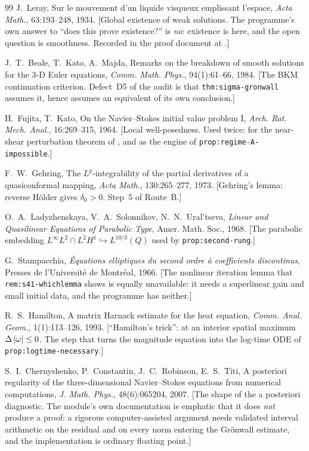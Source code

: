 \begin{thebibliography}{99}
  J.~Leray,
  Sur le mouvement d'un liquide visqueux emplissant l'espace,
  \emph{Acta Math.}, 63:193--248, 1934.
  \textsf{[Global existence of weak solutions. The programme's own answer to
  ``does this prove existence?'' is \emph{no}: existence is here, and the open
  question is smoothness. Recorded in the proof document at .]}

  J.~T.~Beale, T.~Kato, A.~Majda,
  Remarks on the breakdown of smooth solutions for the 3-D Euler equations,
  \emph{Comm. Math. Phys.}, 94(1):61--66, 1984.
  \textsf{[The BKM continuation criterion. Defect~D5 of the  audit is
  that \texttt{thm:sigma-gronwall} assumes it, hence assumes an equivalent of
  its own conclusion.]}

  H.~Fujita, T.~Kato,
  On the Navier--Stokes initial value problem I,
  \emph{Arch. Rat. Mech. Anal.}, 16:269--315, 1964.
  \textsf{[Local well-posedness. Used twice: for the near-shear perturbation
  theorem of , and as the engine of
  \texttt{prop:regime-A-impossible}.]}

  F.~W.~Gehring,
  The \(L^p\)-integrability of the partial derivatives of a quasiconformal
  mapping,
  \emph{Acta Math.}, 130:265--277, 1973.
  \textsf{[Gehring's lemma: reverse H\"older gives \(\delta_0>0\). Step~5 of
  Route~B.]}

  O.~A.~Ladyzhenskaya, V.~A.~Solonnikov, N.~N.~Ural'tseva,
  \emph{Linear and Quasilinear Equations of Parabolic Type},
  Amer. Math. Soc., 1968.
  \textsf{[The parabolic embedding \(L^\infty L^2\cap L^2H^1\hookrightarrow
  L^{10/3}(Q)\) used by \texttt{prop:second-rung}.]}

  G.~Stampacchia,
  \emph{\'Equations elliptiques du second ordre \`a coefficients
  discontinus},
  Presses de l'Universit\'e de Montr\'eal, 1966.
  \textsf{[The nonlinear iteration lemma that
  \texttt{rem:s41-whichlemma} shows is equally unavailable: it needs a
  superlinear gain and small initial data, and the programme has neither.]}

  R.~S.~Hamilton,
  A matrix Harnack estimate for the heat equation,
  \emph{Comm. Anal. Geom.}, 1(1):113--126, 1993.
  \textsf{[``Hamilton's trick'': at an interior spatial maximum
  \(\Delta\left|\omega\right|\le0\). The step that turns the magnitude equation into
  the log-time ODE of \texttt{prop:logtime-necessary}.]}

  S.~I.~Chernyshenko, P.~Constantin, J.~C.~Robinson, E.~S.~Titi,
  A posteriori regularity of the three-dimensional Navier--Stokes equations
  from numerical computations,
  \emph{J. Math. Phys.}, 48(6):065204, 2007.
  \textsf{[The shape of the  a posteriori diagnostic. The module's own
  documentation is emphatic that it does \emph{not} produce a proof: a
  rigorous computer-assisted argument needs validated interval arithmetic on
  the residual and on every norm entering the Gr\"onwall estimate, and the
  implementation is ordinary floating point.]}


\end{thebibliography}
